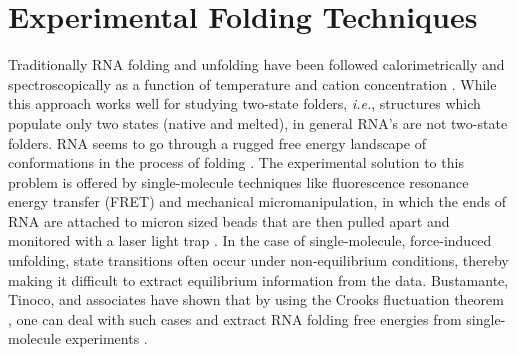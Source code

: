 \section{Experimental Folding Techniques}
Traditionally   RNA   folding  and   unfolding   have  been   followed
calorimetrically  and spectroscopically as  a function  of temperature
and cation concentration  \cite{bloomfield2000, boots2008}. While this
approach  works well  for studying  two-state  folders, \textit{i.e.},
structures  which populate  only two  states (native  and  melted), in
general RNA's  are not  two-state folders. RNA  seems to go  through a
rugged  free  energy landscape  of  conformations  in  the process  of
folding \cite{zhuang2003}.  The  experimental solution to this problem
is offered  by single-molecule techniques  like fluorescence resonance
energy transfer (FRET) and  mechanical micromanipulation, in which the
ends of RNA  are attached to micron sized beads  that are then pulled
apart  and  monitored  with  a laser  light  trap  \cite{liphardt2001,
  onoa2004,  tinoco2004, hyeon2005}.  In  the case  of single-molecule,
force-induced   unfolding,  state   transitions   often  occur   under
non-equilibrium  conditions, thereby  making it  difficult  to extract
equilibrium  information from the  data. Bustamante, Tinoco,
and associates have shown that by using the Crooks fluctuation theorem
\cite{crooks1999},  one  can deal  with  such  cases  and extract  RNA
folding    free     energies    from    single-molecule    experiments
\cite{collin2005}. %



